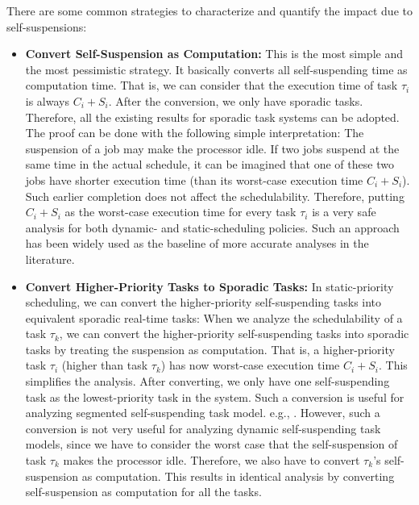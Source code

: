 There are some common strategies to characterize and quantify the impact due to self-suspensions:
\begin{itemize}
\item {\bf Convert Self-Suspension as Computation:} This is the most simple and the most pessimistic strategy. It basically converts all self-suspending time as computation time. That is, we can consider that the execution time of task $\tau_i$ is always $C_i+S_i$. After the conversion, we only have sporadic tasks. Therefore, all the existing results for sporadic task systems can be adopted. The proof can be done with the following simple interpretation: The suspension of a job may make the processor idle. If two jobs suspend at the same time in the actual schedule, it can be imagined that one of these two jobs have shorter execution time (than its worst-case execution time $C_i+S_i$). Such earlier completion does not affect the schedulability. Therefore, putting $C_i+S_i$ as the worst-case execution time for every task $\tau_i$ is a very safe analysis for both dynamic- and static-scheduling policies.  Such an approach has been widely used as the baseline of more accurate analyses in the literature.

\item {\bf Convert Higher-Priority Tasks to Sporadic Tasks:} In static-priority scheduling, we can convert the higher-priority self-suspending tasks into equivalent sporadic real-time tasks: When we analyze the schedulability of a task $\tau_k$, we can convert the higher-priority self-suspending tasks into sporadic tasks by treating the suspension as computation. That is, a higher-priority task $\tau_i$ (higher than task $\tau_k$) has now worst-case execution time $C_i+S_i$. This simplifies the analysis. After converting, we only have one self-suspending task as the lowest-priority task in the system. Such a conversion is useful for analyzing segmented self-suspending task model. e.g., \cite{LR:rtas10,ecrts15nelissen}. However, such a conversion is not very useful for analyzing dynamic self-suspending task models, since we have to consider the worst case that the self-suspension of task $\tau_k$ makes the processor idle. Therefore, we also have to convert $\tau_k$'s self-suspension as computation. This results in identical analysis by converting self-suspension as computation for all the tasks. 


\end{itemize}
